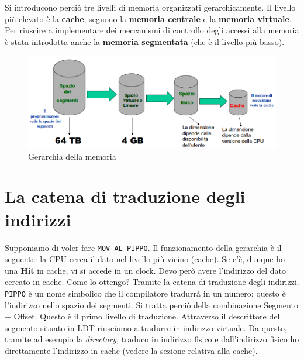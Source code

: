 \documentclass[11pt]{book}
\begin{document}
\par\bigskip

Si introducono perci\`o tre livelli di memoria organizzati
gerarchicamente. Il livello pi\`u elevato \`e la {\bf cache}, seguono
la {\bf memoria centrale} e la {\bf memoria virtuale}. Per riuscire a
implementare dei meccanismi di controllo degli accessi alla memoria
\`e stata introdotta anche la {\bf memoria segmentata} (che \`e il
livello pi\`u basso).

\begin{figure}[h]
  \centering
  \includegraphics[width=.9\textwidth]{images/gerarchia.png}
  \caption{Gerarchia della memoria}
  \label{gerarchia}
\end{figure}

\section{La catena di traduzione degli indirizzi}

Supponiamo di voler fare {\tt MOV AL PIPPO}. Il funzionamento della
gerarchia \`e il seguente: la CPU cerca il dato nel livello pi\`u
vicino (cache). Se c'\`e, dunque ho una {\bf Hit} in cache, vi si accede in
un clock. Devo per\`o avere l'indirizzo del dato cercato in
cache. Come lo ottengo? Tramite la catena di traduzione degli
indirizzi. {\tt PIPPO} \`e un nome simbolico che il compilatore
tradurr\`a in un numero: questo \`e l'indirizzo nello spazio dei
segmenti. Si tratta perci\`o della combinazione Segmento +
Offset. Questo \`e il primo livello di traduzione. Attraverso il
descrittore del segmento situato in LDT riusciamo a tradurre in
indirizzo virtuale. Da questo, tramite ad esempio la {\em directory},
traduco in indirizzo fisico e dall'indirizzo fisico ho direttamente
l'indirizzo in cache (vedere la sezione relativa alla cache). 

\par\bigskip
\end{document}
